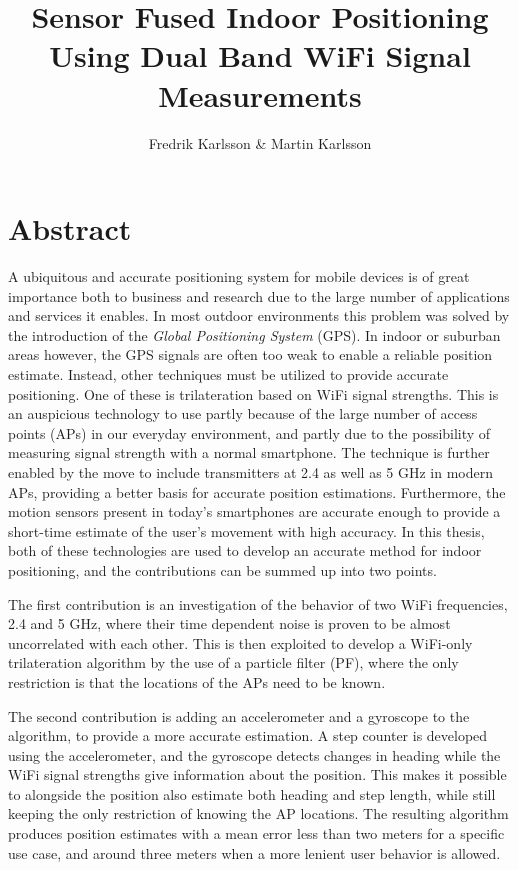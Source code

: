 \documentclass{LTHthesis}
\begin{document}
\begin{titlepages}
\author{Fredrik Karlsson \& Martin Karlsson}
\title{Sensor Fused Indoor Positioning Using Dual Band WiFi Signal Measurements}%
\end{titlepages}
\chapter*{Abstract}
A ubiquitous and accurate positioning system for mobile devices is of great importance both to business and research due to the large number of applications and services it enables. In most outdoor environments this problem was solved by the introduction of the \emph{Global Positioning System} (GPS). In indoor or suburban areas however, the GPS signals are often too weak to enable a reliable position estimate. Instead, other techniques must be utilized to provide accurate positioning. One of these is trilateration based on WiFi signal strengths. This is an auspicious technology to use partly because of the large number of access points (APs) in our everyday environment, and partly due to the possibility of measuring signal strength with a normal smartphone. The technique is further enabled by the move to include transmitters at 2.4  as well as 5 GHz in modern APs, providing a better basis for accurate position estimations. Furthermore, the motion sensors present in today's smartphones are accurate enough to provide a short-time estimate of the user's movement with high accuracy. In this thesis, both of these technologies are used to develop an accurate method for indoor positioning, and the contributions can be summed up into two points.

The first contribution is an investigation of the behavior of two WiFi frequencies, 2.4 and 5 GHz, where their time dependent noise is proven to be almost uncorrelated with each other. This is then exploited to develop a WiFi-only trilateration algorithm by the use of a particle filter (PF), where the only restriction is that the locations of the APs need to be known. 

The second contribution is adding an accelerometer and a gyroscope to the algorithm, to provide a more accurate estimation. A step counter is developed using the accelerometer, and the gyroscope detects changes in heading while the WiFi signal strengths give information about the position. This makes it possible to alongside the position also estimate both heading and step length, while still keeping the only restriction of knowing the AP locations. The resulting algorithm produces position estimates with a mean error less than two meters for a specific use case, and around three meters when a more lenient user behavior is allowed. 
    
\end{document}
